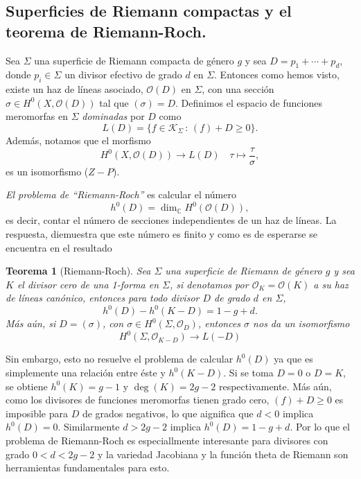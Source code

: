 \documentclass[letterpaper]{article}
\newtheorem{teorema}{Teorema}[section]
\newcommand{\sig}{\ensuremath{\Sigma}}
\newcommand{\co}{\ensuremath{\mathbb C }}
\newcommand{\lnb}{\ensuremath{\mathcal{O}}}
\begin{document}
\subsection{Superficies de Riemann compactas y el teorema de Riemann-Roch.}
\noindent Sea \(\sig\) una superficie de Riemann compacta de género \(g\) y sea \(D=p_{1}+\cdots+p_{d}\), donde \(p_{i}\in\sig\) un divisor efectivo de grado \(d\) en \(\sig\). Entonces como hemos visto, existe un haz de líneas asociado, \(\lnb(D)\) en \(\sig\), con una sección \(\sigma\in H^{0}(X,\lnb(D))\) tal que \((\sigma)=D\). Definimos el espacio de funciones meromorfas en \(\sig\) \emph{dominadas} por \(D\) como
\[
  L(D)=\{f\in\mathcal{K}_{\sig}\,:\,(f)+D\geq0\}.
\]
Además, notamos que el morfismo
\[
  H^{0}(X,\lnb(D))\rightarrow L(D)   \quad \tau\mapsto\frac{\tau}{\sigma},
\]
\noindent es un isomorfismo (\(Z-P\)).

\emph{El problema de ``Riemann-Roch''} es calcular el número
\[
  h^{0}(D)=\dim_{\co}H^{0}(\lnb(D)),
\]
es decir, contar el número de secciones independientes de un haz de líneas. La respuesta, diemuestra que este número es finito y como es de esperarse se encuentra en el resultado
\begin{teorema}[Riemann-Roch]
  Sea \(\sig\) una superficie de Riemann de género \(g\) y sea \(K\) el divisor cero de una 1-forma en \(\sig\), si denotamos por \(\lnb_{K}=\lnb(K)\) a su haz de líneas canónico, entonces para todo divisor \(D\) de grado \(d\) en \(\sig\),
  \[
    h^{0}(D)-h^{0}(K-D)=1-g+d.
  \]
  Más aún, si \(D=(\sigma)\), con \(\sigma\in H^{0}(\sig,\lnb_{D}) \), entonces \(\sigma\) nos da un isomorfismo
  \[
    H^{0}(\sig,\lnb_{K-D})\rightarrow L(-D)
  \]

\end{teorema}
Sin embargo, esto no resuelve el problema de calcular \(h^{0}(D)\) ya que es simplemente una relación entre éste y \(h^{0}(K-D)\). Si se toma \(D=0\) o \(D=K\), se obtiene \(h^{0}(K)=g-1\) y \(\deg(K)=2g-2\) respectivamente. Más aún, como los divisores de funciones meromorfas tienen grado cero, \((f)+D\geq0\) es imposible para \(D\) de grados negativos, lo que aignifica que \(d<0\) implica \(h^{0}(D)=0\). Similarmente \(d>2g-2\) implica \(h^{0}(D)=1-g+d\). Por lo que el problema de Riemann-Roch es especiallmente interesante para divisores con grado \(0<d<2g-2\) y la variedad Jacobiana y la función theta de Riemann son herramientas fundamentales para esto.
\end{document}
